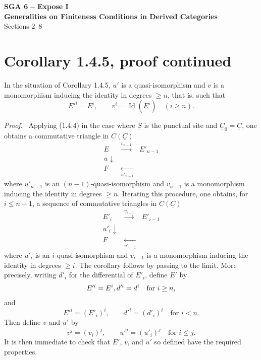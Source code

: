 \documentclass[13pt]{extarticle}
\newcommand{\uS}{\underline S}
\newcommand{\uC}{\underline C}
\newenvironment{prooftext}[1][Proof]{\par\noindent\emph{#1.}\ }{\par\medskip}
\begin{document}
\begin{center}
{\Large \textbf{SGA 6 -- Expose I}}\\[0.35em]
{\large \textbf{Generalities on Finiteness Conditions in Derived Categories}}\\[0.25em]
{\large Sections 2--8}
\end{center}

\section*{Corollary 1.4.5, proof continued}

In the situation of Corollary 1.4.5, $u'$ is a quasi-isomorphism and $v$ is a monomorphism inducing the identity in degrees $\geq n$, that is, such that
\[
E'^i=E^i,\qquad v^i=\operatorname{Id}(E^i)\quad (i\geq n).
\]

\begin{prooftext}
Applying (1.4.4) in the case where $\uS$ is the punctual site and $\uC_0=\uC$, one obtains a commutative triangle in $C(\uC)$
\[
\begin{array}{ccc}
E & \xrightarrow{v_{n-1}} & E'_{n-1}\\
u\downarrow && \\
F & \underset{u'_{n-1}}{\longleftarrow} &
\end{array}
\]
where $u'_{n-1}$ is an $(n-1)$-quasi-isomorphism and $v_{n-1}$ is a monomorphism inducing the identity in degrees $\geq n$. Iterating this procedure, one obtains, for $i\leq n-1$, a sequence of commutative triangles in $C(\uC)$
\[
\begin{array}{ccc}
E'_i & \xrightarrow{v_{i-1}} & E'_{i-1}\\
u'_i\downarrow && \\
F & \underset{u'_{i-1}}{\longleftarrow} &
\end{array}
\]
where $u'_i$ is an $i$-quasi-isomorphism and $v_{i-1}$ is a monomorphism inducing the identity in degrees $\geq i$. The corollary follows by passing to the limit. More precisely, writing $d'_i$ for the differential of $E'_i$, define $E'$ by
\[
E'^i=E^i,\\ d'^i=d^i\quad\text{for }i\geq n,
\]
and
\[
E'^i=(E'_i)^i,\qquad d'^i=(d'_i)^i\quad\text{for }i<n.
\]
Then define $v$ and $u'$ by
\[
v^j=(v_i)^j,
\qquad
u'^j=(u'_i)^j
\quad\text{for }i\leq j.
\]
It is then immediate to check that $E'$, $v$, and $u'$ so defined have the required properties.
\end{prooftext}
\end{document}
